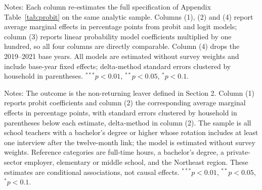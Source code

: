 \documentclass[11pt,a4paper]{article}
\newcommand{\fignote}[1]{\par\vspace{4pt}%
  \begin{minipage}{\linewidth}\footnotesize\color{ecgray}#1\end{minipage}}
\begin{document}
\begin{table}[htbp]
  \caption{Robustness to estimator and sample. Dependent variable
  equals one for non-returning leavers.}
  \label{tab:robust}
  \centering\footnotesize
  \renewcommand{\arraystretch}{0.95}
  
  \fignote{Notes: Each column re-estimates the full specification of Appendix
  Table~\ref{tab:probit} on the same analytic sample. Columns (1), (2) and
  (4) report average marginal effects in percentage points from probit and
  logit models; column (3) reports linear probability model coefficients
  multiplied by one hundred, so all four columns are directly comparable.
  Column (4) drops the 2019--2021 base years. All models are estimated
  without survey weights and include base-year fixed effects; delta-method
  standard errors clustered by household in parentheses.
  $^{***}p<0.01$, $^{**}p<0.05$, $^{*}p<0.1$.}
\end{table}

\begin{table}[htbp]
  \caption{Determinants of leaving teaching. Probit, dependent
  variable equals one for non-returning leavers, 2005--2025.}
  \label{tab:probit}
  \centering\footnotesize
  \renewcommand{\arraystretch}{0.78}
  
  \fignote{Notes: The outcome is the non-returning leaver defined in Section
  2. Column (1) reports probit coefficients and column (2) the corresponding
  average marginal effects in percentage points, with standard errors
  clustered by household in parentheses below each estimate, delta-method
  in column (2). The sample is all school teachers with a bachelor's degree
  or higher whose rotation includes at least one interview after the
  twelve-month link; the model is estimated without survey weights.
  Reference categories are full-time hours, a bachelor's degree, a
  private-sector employer, elementary or middle school, and the Northeast
  region. These estimates are conditional associations, not causal effects.
  $^{***}p<0.01$, $^{**}p<0.05$, $^{*}p<0.1$.}
\end{table}
\end{document}
